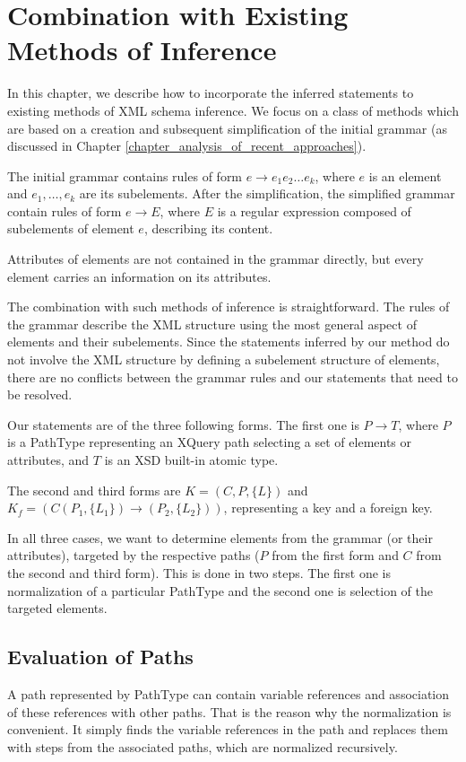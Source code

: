 \chapter{Combination with Existing Methods of Inference} \label{CHAPTER_combination_with_existings_methods_of_inference}
In this chapter, we describe how to incorporate the inferred statements to existing methods of XML schema inference. We focus on a class of methods which are based on a creation and subsequent simplification of the initial grammar (as discussed in Chapter \ref{chapter_analysis_of_recent_approaches}).

The initial grammar contains rules of form $e \rightarrow e_1e_2\dots e_k$, where $e$ is an element and $e_1, \dots , e_k$ are its subelements. After the simplification, the simplified grammar contain rules of form $e \rightarrow E$, where $E$ is a regular expression composed of subelements of element $e$, describing its content.

Attributes of elements are not contained in the grammar directly, but every element carries an information on its attributes.

The combination with such methods of inference is straightforward. The rules of the grammar describe the XML structure using the most general aspect of elements and their subelements. Since the statements inferred by our method do not involve the XML structure by defining a subelement structure of elements, there are no conflicts between the grammar rules and our statements that need to be resolved.

Our statements are of the three following forms. The first one is $P \rightarrow T$, where $P$ is a PathType representing an XQuery path selecting a set of elements or attributes, and $T$ is an XSD built-in atomic type.

The second and third forms are $K = (C,P,\{L\})$ and $K_f = (C(P_1,\{L_1\}) \rightarrow (P_2,\{L_2\}))$, representing a key and a foreign key.

In all three cases, we want to determine elements from the grammar (or their attributes), targeted by the respective paths ($P$ from the first form and $C$ from the second and third form). This is done in two steps. The first one is normalization of a particular PathType and the second one is selection of the targeted elements.

\section{Evaluation of Paths}
A path represented by PathType can contain variable references and association of these references with other paths. That is the reason why the normalization is convenient. It simply finds the variable references in the path and replaces them with steps from the associated paths, which are normalized recursively.

